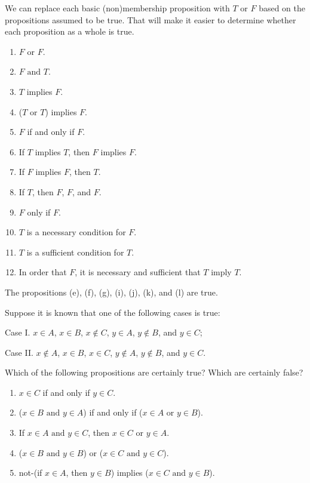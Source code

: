 \documentclass{report}
\renewcommand*{\land}{\text{ and }}
\renewcommand*{\lor}{\text{ or }}
\begin{document}
\begin{solution}
We can replace each basic (non)membership proposition with $T$ or $F$ based on
the propositions assumed to be true. That will make it easier to determine whether
each proposition as a whole is true.
\begin{enumerate}[label=(\alph*)]
    \item $F\lor F$.
    \item $F\land T$.
    \item $T$ implies $F$.
    \item ($T\lor T$) implies $F$.
    \item $F$ if and only if $F$.
    \item If $T$ implies $T$, then $F$ implies $F$.
    \item If $F$ implies $F$, then $T$.
    \item If $T$, then $F$, $F$, and $F$.
    \item $F$ only if $F$.
    \item $T$ is a necessary condition for $F$.
    \item $T$ is a sufficient condition for $T$.
    \item In order that $F$, it is necessary and sufficient that $T$ imply $T$.
\end{enumerate}
The propositions (e), (f), (g), (i), (j), (k), and (l) are true.
\end{solution}

\begin{exercise}
Suppose it is known that one of the following cases is true:

Case I. $x\in A$, $x\in B$, $x\nin C$, $y\in A$, $y\nin B$, and $y\in C$;

Case II. $x\nin A$, $x\in B$, $x\in C$, $y\nin A$, $y\nin B$, and $y\in C$.

Which of the following propositions are certainly true? Which are certainly false?

\begin{enumerate}[label=(\alph*)]
    \item $x\in C$ if and only if $y\in C$.
    \item ($x\in B\land y\in A$) if and only if ($x\in A\lor y\in B$).
    \item If $x\in A\land y\in C$, then $x\in C\lor y\in A$.
    \item ($x\in B\land y\in B$) or ($x\in C\land y\in C$).
    \item not-(if $x\in A$, then $y\in B$) implies ($x\in C\land y\in B$).
\end{enumerate}
\end{exercise}
\end{document}
